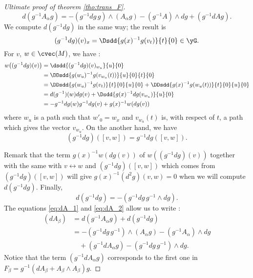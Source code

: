 \begin{proof}[Ultimate proof of theorem \ref{tho:trans_F}]
\begin{equation}\label{eq:dA_1}
  d(g^{-1} A_{\alpha} g)=-(g^{-1} dg\,g)\wedge(A_{\alpha} g)-(g^{-1} A)\wedge dg+(g^{-1} dA g).
\end{equation}
We compute $d(g^{-1} dg)$ in the same way; the result is
\[
   (g^{-1} dg)(v)_x=\Dsdd{g(x)^{-1} g(v_t)}{t}{0}\in\yG.
\]
For $v$, $w\in\cvec(M)$, we have :
\begin{equation}
\begin{split}
   w\big((g^{-1} dg)(v)\big)&=\dsdd{ (g^{-1} dg)(v)_{w_u} }{u}{0}\\
                   &=\DDsdd{  g(w_u)^{-1} g(v_{w_u}(t))  }{u}{0}{t}{0}\\
		   &=\DDsdd{  g(w_u)^{-1} g(v_t)  }{t}{0}{u}{0}
		      +\DDsdd{  g(x)^{-1} g(w_u(t))  }{t}{0}{u}{0}\\
		   &=d(g^{-1})(w)dg(v)+\Dsdd{ g(x)^{-1} dg(v_{w_u}) }{u}{0}\\
		   &=-g^{-1} dg(w)g^{-1} dg(v)+g(x)^{-1} w(dg(v))
\end{split}
\end{equation}
where $w_u$ is a path such that $w'_0=w_x$ and $v_{w_u}(t)$ is, with respect of $t$, a path which gives the vector $v_{w_u}$. On the another hand, we have
\[
   (g^{-1} dg)([v,w])=g^{-1} dg([v,w]).
\]

Remark that the term $g(x)^{-1} w(dg(v))$ of  $w((g^{-1} dg)(v))$ together with the same with $v\leftrightarrow w$ and $(g^{-1} dg)([v,w])$ which comes from  $(g^{-1} dg)([v,w])$ will give $g(x)^{-1}(d^2g)(v,w)=0$ when we will compute $d(g^{-1} dg)$.
Finally,
\begin{equation}\label{eq:dA_2}
   d(g^{-1} dg)=-(g^{-1} dg\,g^{-1}\wedge dg).
\end{equation}
The equations \eqref{eq:dA_1} and \eqref{eq:dA_2} allow us to write :
\begin{equation}\label{eq:dA}
\begin{split}
    (dA_{\beta})&=d(g^{-1} A_{\alpha} g)+d(g^{-1} dg)\\
              &=-(g^{-1} dg\,g^{-1}) \wedge(A_{\alpha} g)-(g^{-1} A_{\alpha})\wedge dg\\
	      &\quad+(g^{-1} dA_{\alpha} g)-(g^{-1} dg\,g^{-1})\wedge dg.
\end{split}
\end{equation}
Notice that the term $(g^{-1} dA_{\alpha} g)$ corresponds to the first one in $F_{\beta}=g^{-1}(dA_{\beta}+A_{\beta}\wedge A_{\beta})g$.


\end{proof}
